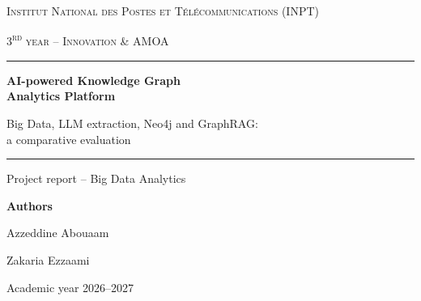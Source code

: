\documentclass[11pt,a4paper]{report}
\begin{document}
\begin{titlepage}
  \centering
  {\large\scshape Institut National des Postes et T\'el\'ecommunications (INPT)\par}
  \vspace{0.3cm}
  {\scshape 3\textsuperscript{rd} year -- Innovation \& AMOA\par}
  \vspace{3cm}
  \rule{\linewidth}{0.6pt}\par\vspace{0.4cm}
  {\Huge\bfseries AI-powered Knowledge Graph\\[0.2cm] Analytics Platform\par}
  \vspace{0.4cm}
  {\Large Big Data, LLM extraction, Neo4j and GraphRAG:\\ a comparative evaluation\par}
  \vspace{0.3cm}
  \rule{\linewidth}{0.6pt}\par
  \vspace{2.5cm}
  {\large Project report -- Big Data Analytics\par}
  \vspace{2cm}
  {\large\textbf{Authors}\par}
  \vspace{0.3cm}
  {\Large Azzeddine Abouaam\par}
  \vspace{0.15cm}
  {\Large Zakaria Ezzaami\par}
  \vfill
  {\large Academic year 2026--2027\par}
\end{titlepage}
\end{document}
